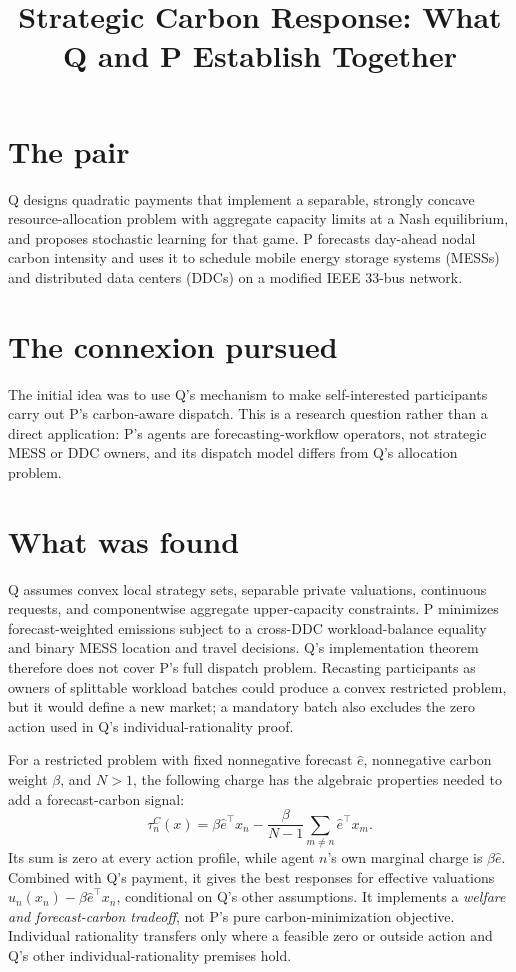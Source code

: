 \documentclass{article}
\title{Strategic Carbon Response: What Q and P Establish Together}
\begin{document}
\maketitle

\section*{The pair}

Q designs quadratic payments that implement a separable, strongly concave resource-allocation problem with aggregate capacity limits at a Nash equilibrium, and proposes stochastic learning for that game. P forecasts day-ahead nodal carbon intensity and uses it to schedule mobile energy storage systems (MESSs) and distributed data centers (DDCs) on a modified IEEE 33-bus network. 

\section*{The connexion pursued}

The initial idea was to use Q's mechanism to make self-interested participants carry out P's carbon-aware dispatch. This is a research question rather than a direct application: P's agents are forecasting-workflow operators, not strategic MESS or DDC owners, and its dispatch model differs from Q's allocation problem. 

\section*{What was found}

Q assumes convex local strategy sets, separable private valuations, continuous requests, and componentwise aggregate upper-capacity constraints. P minimizes forecast-weighted emissions subject to a cross-DDC workload-balance equality and binary MESS location and travel decisions. Q's implementation theorem therefore does not cover P's full dispatch problem. Recasting participants as owners of splittable workload batches could produce a convex restricted problem, but it would define a new market; a mandatory batch also excludes the zero action used in Q's individual-rationality proof. 

For a restricted problem with fixed nonnegative forecast \(\widehat e\), nonnegative carbon weight \(\beta\), and \(N>1\), the following charge has the algebraic properties needed to add a forecast-carbon signal:
\[
\tau_n^C(x)
 =\beta\widehat e^\top x_n
 -\frac{\beta}{N-1}\sum_{m\ne n}\widehat e^\top x_m.
\]
Its sum is zero at every action profile, while agent \(n\)'s own marginal charge is \(\beta\widehat e\). Combined with Q's payment, it gives the best responses for effective valuations \(u_n(x_n)-\beta\widehat e^\top x_n\), conditional on Q's other assumptions. It implements a \emph{welfare and forecast-carbon tradeoff}, not P's pure carbon-minimization objective. Individual rationality transfers only where a feasible zero or outside action and Q's other individual-rationality premises hold. 
\end{document}
